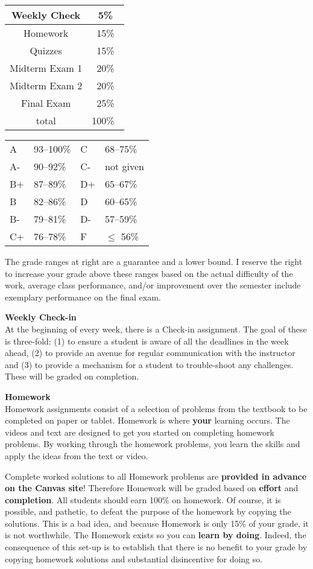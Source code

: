 \documentclass[12pt]{article}
\renewcommand{\emph}[1]{\textsf{\textbf{#1}}}
\newcommand{\localhead}[1]{\par\smallskip\textbf{#1} \smallskip\nobreak\\}%
\def\heading#1{\localhead{\large\emph{#1}}}
\begin{document}
\begin{multicols}{2}
\begin{tabular}{|c|c|}
\hline
Weekly Check & 5\%\\
\hline
Homework & 15\% \\
\hline
Quizzes & 15\% \\
\hline
Midterm Exam 1 & 20\% \\
\hline
Midterm Exam 2 & 20\%  \\
\hline
Final Exam & 25\% \\
\hline
total & 100\% \, \\
\hline
\end{tabular}


\begin{tabular}{llll}
A  & 93--100\%& C  & 68--75\%  \\
A- & 90--92\% & C- & not given \\
B+ & 87--89\% & D+ & 65--67\%  \\
B  & 82--86\% & D  & 60--65\%  \\
B- & 79--81\% & D- & 57--59\%  \\
C+ & 76--78\% & F  & $\le$ 56\%
\end{tabular}
\end{multicols}

The grade ranges at right are a guarantee and a lower bound. I reserve the right to increase your grade above these ranges based on the actual difficulty of the work, average class performance, and/or improvement over the semester include exemplary performance on the final exam. 

\heading{Weekly Check-in}
At the beginning of every week, there is a Check-in assignment. The goal of these is three-fold: (1) to ensure a student is aware of all the deadlines in the week ahead, (2) to provide an avenue for regular communication with the instructor and (3) to provide a mechanism for a student to trouble-shoot any challenges. These will be graded on completion. 

\newpage
\heading{Homework}
Homework assignments consist of a selection of problems from the textbook to be completed on paper or tablet.  Homework is where \textbf{your} learning occurs. The videos and text are designed to get you started on completing homework problems. By working through the homework problems, you learn the skills and apply the ideas from the text or video.

Complete worked solutions to all Homework problems are \emph{provided in advance on the Canvas site}!  Therefore Homework will be graded based on \emph{effort} and \emph{completion}.  All students should earn 100\% on homework.  Of course, it is possible, and pathetic, to defeat the purpose of the homework by copying the solutions.  This is a bad idea, and because Homework is only 15\% of your grade, it is not worthwhile.  The Homework exists so you can \emph{learn by doing}. Indeed, the consequence of this set-up is to establish that there is no benefit to your grade by copying homework solutions and substantial disincentive for doing so. 
\end{document}
